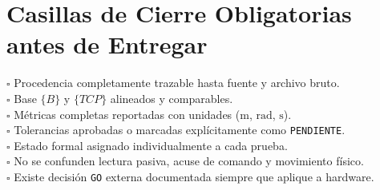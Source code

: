 \documentclass[10.5pt, a4paper]{article}
\begin{document}
\section{Casillas de Cierre Obligatorias antes de Entregar}
\begin{tcolorbox}[colback=white, colframe=ucbblue, left=2mm, right=2mm, top=1.5mm, bottom=1.5mm]
    \footnotesize\raggedright
    $\square$ Procedencia completamente trazable hasta fuente y archivo bruto.\\
    $\square$ Base $\{B\}$ y $\{TCP\}$ alineados y comparables.\\
    $\square$ Métricas completas reportadas con unidades ($\mathrm{m}$, $\mathrm{rad}$, $\mathrm{s}$).\\
    $\square$ Tolerancias aprobadas o marcadas explícitamente como \texttt{PENDIENTE}.\\
    $\square$ Estado formal asignado individualmente a cada prueba.\\
    $\square$ No se confunden lectura pasiva, acuse de comando y movimiento físico.\\
    $\square$ Existe decisión \texttt{GO} externa documentada siempre que aplique a hardware.
\end{tcolorbox}
\end{document}
